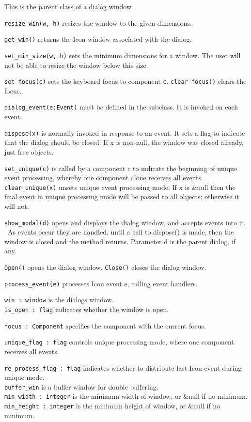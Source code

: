 This is the parent class of a dialog window.

\noindent\texttt{resize\_win(w, h)} resizes the window to the given dimensions.

\noindent\texttt{get\_win()} returns the Icon window associated with the dialog.

\noindent\texttt{set\_min\_size(w, h)} sets the minimum dimensions for a window. The user
will not be able to resize the window below this size.

\noindent\texttt{set\_focus(c)} sets the keyboard focus to component \texttt{c}.
\texttt{clear\_focus()} clears the focus.

\noindent\texttt{dialog\_event(e:Event)} must be defined in the subclass. It is
invoked on each event.

\noindent\texttt{dispose(x)} is normally invoked in response to an event.
It sets a
flag to indicate that the dialog should be closed. If x is non-null,
the window was closed already, just free objects.

\noindent\texttt{set\_unique(c)} is called by a component c to indicate the beginning of
unique event processing, whereby one component alone receives all
events.\\
\texttt{clear\_unique(x)} unsets unique event processing mode. If x is \&null
then the final event in unique processing mode will be passed to all
objects; otherwise it will not.

\texttt{show\_modal(d)} opens and displays the dialog window, and accepts events
into it. \ As events occur they are handled, until a call to dispose()
is made, then the window is closed and the method returns. Parameter d
is the parent dialog, if any.

\texttt{Open()} opens the dialog window.
\texttt{Close()} closes the dialog window.

\texttt{process\_event(e)} processes Icon event e, calling event handlers.

\texttt{win : window} is the dialog{\textquotesingle}s window.\\
\texttt{is\_open : flag} indicates whether the window is open.

\texttt{focus : Component} specifies the component with the current focus.

\texttt{unique\_flag : flag} controls unique processing mode, where one
component receives all events.

\texttt{re\_process\_flag : flag} indicates whether to distribute last
Icon event during unique mode.\\
\texttt{buffer\_win} is a buffer window for double buffering.\\
\texttt{min\_width : integer} is the minimum width of window, or \&null if no
minimum.\\
\texttt{min\_height : integer} is the minimum height of window, or \&null if no
minimum.

